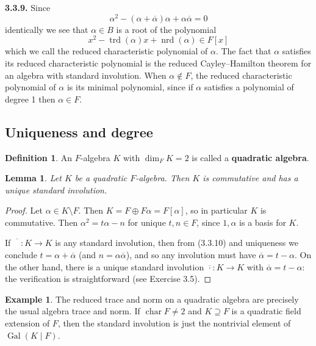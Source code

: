\documentclass{article}
\newtheorem{lemma}[theorem]{Lemma}
\theoremstyle{definition}
\newtheorem{definition}[theorem]{Definition}
\newtheorem{example}[theorem]{Example}
\begin{document}
\textbf{3.3.9.} Since
\begin{equation}
\alpha^2 - (\alpha + \overline{\alpha})\alpha + \alpha \overline{\alpha} = 0 \tag{3.3.10}
\end{equation}
identically we see that $\alpha \in B$ is a root of the polynomial
\begin{equation}
x^2 - \operatorname{trd}(\alpha)x + \operatorname{nrd}(\alpha) \in F[x] \tag{3.3.11}
\end{equation}
which we call the reduced characteristic polynomial of $\alpha$. The fact that $\alpha$ satisfies its reduced characteristic polynomial is the reduced Cayley--Hamilton theorem for an algebra with standard involution. When $\alpha \notin F$, the reduced characteristic polynomial of $\alpha$ is its minimal polynomial, since if $\alpha$ satisfies a polynomial of degree 1 then $\alpha \in F$.

\subsection{Uniqueness and degree}

\begin{definition}
An $F$-algebra $K$ with $\dim_F K = 2$ is called a \textbf{quadratic algebra}.
\end{definition}

\begin{lemma}
Let $K$ be a quadratic $F$-algebra. Then $K$ is commutative and has a unique standard involution.
\end{lemma}

\begin{proof}
Let $\alpha \in K \setminus F$. Then $K = F \oplus F\alpha = F[\alpha]$, so in particular $K$ is commutative. Then $\alpha^2 = t\alpha - n$ for unique $t, n \in F$, since $1, \alpha$ is a basis for $K$.

If $\overline{\phantom{K}} : K \to K$ is any standard involution, then from (3.3.10) and uniqueness we conclude $t = \alpha + \overline{\alpha}$ (and $n = \alpha\overline{\alpha}$), and so any involution must have $\overline{\alpha} = t - \alpha$. On the other hand, there is a unique standard involution $\overline{\cdot} : K \to K$ with $\overline{\alpha} = t - \alpha$: the verification is straightforward (see Exercise 3.5).
\end{proof}

\begin{example}
The reduced trace and norm on a quadratic algebra are precisely the usual algebra trace and norm. If $\operatorname{char} F \neq 2$ and $K \supseteq F$ is a quadratic field extension of $F$, then the standard involution is just the nontrivial element of $\operatorname{Gal}(K \mid F)$.
\end{example}
\end{document}
